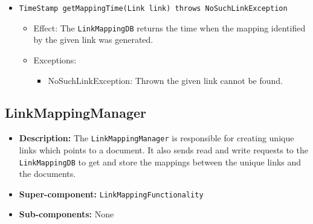 \documentclass[a4paper,10pt]{article}
\begin{document}
\begin{itemize}
\begin{itemize}
		\item \texttt{TimeStamp getMappingTime(Link link) throws NoSuchLinkException}
		 \begin{itemize}
            \item Effect: The \texttt{LinkMappingDB} returns the time when the mapping identified by the given link was generated.
            \item Exceptions: 
            \begin{itemize}
            	\item NoSuchLinkException: Thrown the given link cannot be found.
            \end{itemize}
		\end{itemize}  
        

    \end{itemize}
\end{itemize}

\subsection{LinkMappingManager}
\begin{itemize}
    \item \textbf{Description:} The \texttt{LinkMappingManager} is responsible for creating unique links which points to a document. It also sends read and write requests to the \texttt{LinkMappingDB} to get and store the mappings between the unique links and the documents.
    \item \textbf{Super-component:} \texttt{LinkMappingFunctionality}
    \item \textbf{Sub-components:} None
\end{itemize}
\end{document}
